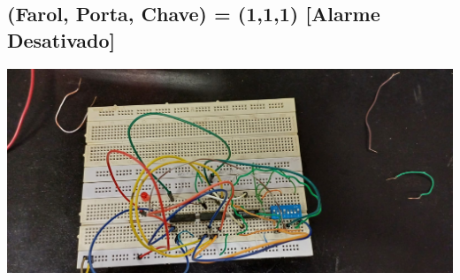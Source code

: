 \documentclass[]{article}
\begin{document}
		\subsection{(Farol, Porta, Chave) = (1,1,1) [Alarme Desativado]}
			\includegraphics[scale=0.25]{Images/Protoboard 111 Down.jpeg} \\
		
\end{document}
